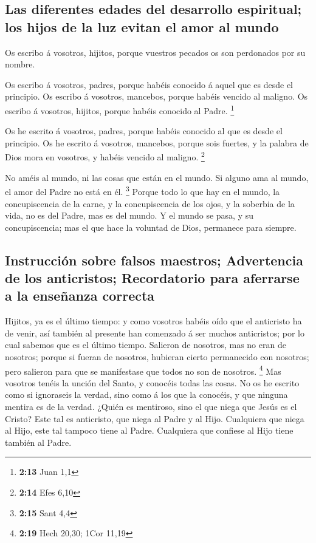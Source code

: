 \hypertarget{las-diferentes-edades-del-desarrollo-espiritual-los-hijos-de-la-luz-evitan-el-amor-al-mundo}{%
\subsection{Las diferentes edades del desarrollo espiritual; los hijos
de la luz evitan el amor al
mundo}\label{las-diferentes-edades-del-desarrollo-espiritual-los-hijos-de-la-luz-evitan-el-amor-al-mundo}}

 Os escribo á vosotros, hijitos, porque vuestros pecados
os son perdonados por su nombre.

 Os escribo á vosotros, padres, porque habéis conocido á
aquel que es desde el principio. Os escribo á vosotros, mancebos, porque
habéis vencido al maligno. Os escribo á vosotros, hijitos, porque habéis
conocido al Padre. \footnote{\textbf{2:13} Juan 1,1}

 Os he escrito á vosotros, padres, porque habéis conocido
al que es desde el principio. Os he escrito á vosotros, mancebos, porque
sois fuertes, y la palabra de Dios mora en vosotros, y habéis vencido al
maligno. \footnote{\textbf{2:14} Efes 6,10}

 No améis al mundo, ni las cosas que están en el mundo.
Si alguno ama al mundo, el amor del Padre no está en él. \footnote{\textbf{2:15}
  Sant 4,4}  Porque todo lo que hay en el mundo, la
concupiscencia de la carne, y la concupiscencia de los ojos, y la
soberbia de la vida, no es del Padre, mas es del mundo. 
Y el mundo se pasa, y su concupiscencia; mas el que hace la voluntad de
Dios, permanece para siempre.

\hypertarget{instrucciuxf3n-sobre-falsos-maestros-advertencia-de-los-anticristos-recordatorio-para-aferrarse-a-la-enseuxf1anza-correcta}{%
\subsection{Instrucción sobre falsos maestros; Advertencia de los
anticristos; Recordatorio para aferrarse a la enseñanza
correcta}\label{instrucciuxf3n-sobre-falsos-maestros-advertencia-de-los-anticristos-recordatorio-para-aferrarse-a-la-enseuxf1anza-correcta}}

 Hijitos, ya es el último tiempo: y como vosotros habéis
oído que el anticristo ha de venir, así también al presente han
comenzado á ser muchos anticristos; por lo cual sabemos que es el último
tiempo.  Salieron de nosotros, mas no eran de nosotros;
porque si fueran de nosotros, hubieran cierto permanecido con nosotros;
pero salieron para que se manifestase que todos no son de nosotros.
\footnote{\textbf{2:19} Hech 20,30; 1Cor 11,19}  Mas
vosotros tenéis la unción del Santo, y conocéis todas las cosas.
 No os he escrito como si ignoraseis la verdad, sino como
á los que la conocéis, y que ninguna mentira es de la verdad.
 ¿Quién es mentiroso, sino el que niega que Jesús es el
Cristo? Este tal es anticristo, que niega al Padre y al Hijo.
 Cualquiera que niega al Hijo, este tal tampoco tiene al
Padre. Cualquiera que confiese al Hijo tiene también al Padre.

